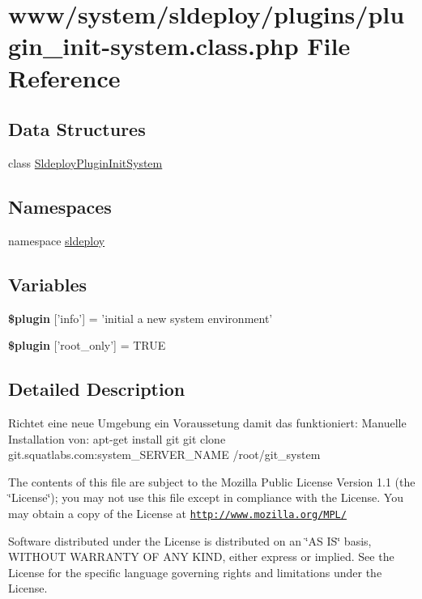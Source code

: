 \hypertarget{plugin__init-system_8class_8php}{
\section{www/system/sldeploy/plugins/plugin\_\-init-\/system.class.php File Reference}
\label{plugin__init-system_8class_8php}
}
\subsection*{Data Structures}
\begin{DoxyCompactItemize}
\item 
class \hyperlink{class_sldeploy_plugin_init_system}{SldeployPluginInitSystem}
\end{DoxyCompactItemize}
\subsection*{Namespaces}
\begin{DoxyCompactItemize}
\item 
namespace \hyperlink{namespacesldeploy}{sldeploy}
\end{DoxyCompactItemize}
\subsection*{Variables}
\begin{DoxyCompactItemize}
\item 
\hypertarget{plugin__init-system_8class_8php_a95edf69ebbeaeedb03bab3bb010f2af9}{
{\bfseries \$plugin} \mbox{[}'info'\mbox{]} = 'initial a new system environment'}
\label{plugin__init-system_8class_8php_a95edf69ebbeaeedb03bab3bb010f2af9}

\item 
\hypertarget{plugin__init-system_8class_8php_a1d302084fa15e3efe6c843cbb5096985}{
{\bfseries \$plugin} \mbox{[}'root\_\-only'\mbox{]} = TRUE}
\label{plugin__init-system_8class_8php_a1d302084fa15e3efe6c843cbb5096985}

\end{DoxyCompactItemize}


\subsection{Detailed Description}
Richtet eine neue Umgebung ein Voraussetung damit das funktioniert: Manuelle Installation von: apt-\/get install git git clone git.squatlabs.com:system\_\-SERVER\_\-NAME /root/git\_\-system

The contents of this file are subject to the Mozilla Public License Version 1.1 (the \char`\"{}License\char`\"{}); you may not use this file except in compliance with the License. You may obtain a copy of the License at \href{http://www.mozilla.org/MPL/}{\tt http://www.mozilla.org/MPL/}

Software distributed under the License is distributed on an \char`\"{}AS IS\char`\"{} basis, WITHOUT WARRANTY OF ANY KIND, either express or implied. See the License for the specific language governing rights and limitations under the License. 